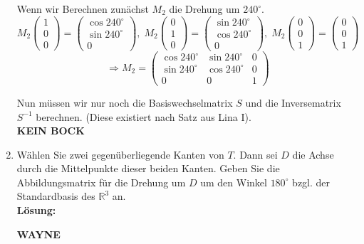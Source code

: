 \documentclass[11pt,a4paper,ngerman]{article}
\newcommand{\R}{\mathbb{R}}
\begin{document}
\begin{enumerate}[\bfseries (a)]
Wenn wir Berechnen zunächst $M_2$ die Drehung um $240^\circ$.\\
$$
M_2 \left( \begin{array}{c} 1 \\ 0 \\ 0 \end{array} \right) = \left( \begin{array}{c} \cos 240^\circ \\ \sin 240^\circ \\ 0 \end{array} \right), \; M_2 \left( \begin{array}{c} 0 \\ 1 \\ 0 \end{array} \right) = \left( \begin{array}{c} \sin 240^\circ \\ \cos 240^\circ \\ 0 \end{array} \right), \; M_2 \left( \begin{array}{c} 0 \\ 0 \\ 1 \end{array} \right) = \left( \begin{array}{c} 0 \\ 0 \\ 1 \end{array} \right)
$$
$$
\Rightarrow M_2 = \left(
\begin{array}{ccc}
\cos 240^\circ & \sin 240^\circ & 0 \\
\sin 240^\circ & \cos 240^\circ & 0 \\
0 & 0 & 1
\end{array} \right)
$$

Nun müssen wir nur noch die Basiswechselmatrix $S$ und die Inversematrix $S^{-1}$ berechnen. (Diese existiert nach Satz aus Lina I).\\

\textbf{\Huge KEIN BOCK}

\item Wählen Sie zwei gegenüberliegende Kanten von $T$. Dann sei $D$ die Achse durch die Mittelpunkte dieser beiden Kanten. Geben Sie die Abbildungsmatrix für die Drehung um $D$ um den Winkel $180^\circ$ bzgl. der Standardbasis des $\R ^3$ an. \\

\textbf{Lösung:}

\textbf{\Huge WAYNE}

\end{enumerate}
\end{document}
